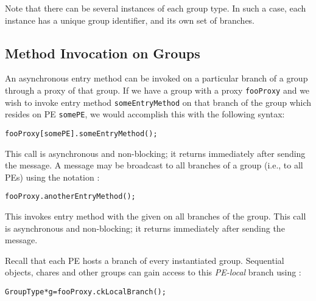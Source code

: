 
Note that there can be several instances of each group type.
In such a case, each instance has a unique group identifier, and its own set
of branches.

\subsection{Method Invocation on Groups}

An asynchronous entry method can be invoked on a particular branch of a
group through a proxy of that group. If we have a group with a proxy
{\tt fooProxy} and we wish to invoke entry method {\tt someEntryMethod} on
that branch of the group which resides on PE {\tt somePE}, we would accomplish
this with the following syntax:

\begin{alltt}
 fooProxy[somePE].someEntryMethod();
\end{alltt}

This call is asynchronous and non-blocking; it returns immediately after sending the message.
A message may be broadcast  to all branches of a group
(i.e., to all PEs) using the notation :

\begin{alltt}
 fooProxy.anotherEntryMethod();
\end{alltt}

This invokes entry method  with the given  on 
all branches of the group. This call is asynchronous and non-blocking; it returns immediately
after sending the message.

Recall that each PE hosts a branch of every instantiated group. 
Sequential objects, chares and other groups can gain access to this {\em PE-local}
branch using :

\begin{alltt}
GroupType *g=fooProxy.ckLocalBranch();
\end{alltt}


